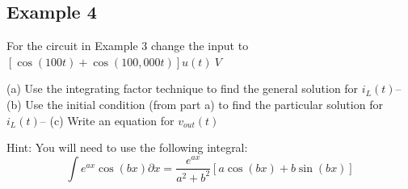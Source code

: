 \documentclass{handout}
\begin{document}
\newpage
\clearpage
\pagebreak

\subsection{Example 4}
For the circuit in Example 3 change the input to $\left[\cos(100t) + \cos(100,000t)\right]u(t)\ V$

(a) Use the integrating factor technique to find the general solution for $i_L(t)$--
(b) Use the initial condition (from part a) to find the particular solution for  $i_L(t)$--
(c) Write an equation for $v_{out}(t)$

Hint: You will need to use the following integral:
\[
\int e^{ax}\cos(bx) \partial x = \frac{e^{ax}}{a^2+b^2}\left[a\cos(bx) +b\sin(bx)  \right]
\]


\newpage
\clearpage
\pagebreak
\end{document}
